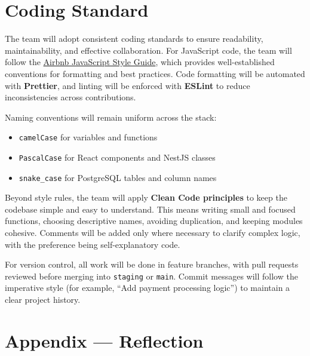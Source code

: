 \documentclass{article}
\begin{document}
\section{Coding Standard}

The team will adopt consistent coding standards to ensure readability, maintainability, and effective collaboration. For JavaScript code, the team will follow the \href{https://github.com/airbnb/javascript}{Airbnb JavaScript Style Guide}, which provides well-established conventions for formatting and best practices. Code formatting will be automated with \textbf{Prettier}, and linting will be enforced with \textbf{ESLint} to reduce inconsistencies across contributions.

Naming conventions will remain uniform across the stack:
\begin{itemize}
  \item \texttt{camelCase} for variables and functions
  \item \texttt{PascalCase} for React components and NestJS classes
  \item \texttt{snake\_case} for PostgreSQL tables and column names
\end{itemize}

Beyond style rules, the team will apply \textbf{Clean Code principles} to keep the codebase simple and easy to understand. This means writing small and focused functions, choosing descriptive names, avoiding duplication, and keeping modules cohesive. Comments will be added only where necessary to clarify complex logic, with the preference being self-explanatory code.

For version control, all work will be done in feature branches, with pull requests reviewed before merging into \texttt{staging} or \texttt{main}. Commit messages will follow the imperative style (for example, “Add payment processing logic”) to maintain a clear project history.

\newpage{}

\section*{Appendix --- Reflection}
\end{document}
